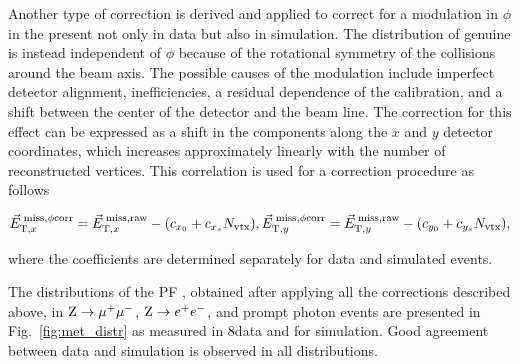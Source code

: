 %
%
Another type of correction is derived and applied to correct for a modulation in $\phi$ in the \ptvecmiss present not only in data but also in simulation. The distribution of genuine \ptvecmiss is instead independent of $\phi$ because of the rotational symmetry of the collisions around the beam axis. The possible causes of the modulation include imperfect detector alignment, inefficiencies, a residual \pt dependence of the calibration, and a shift between the center of the detector and the beam line. The correction for this effect can be expressed as a shift in the \ptvecmiss components along the $x$ and $y$ detector coordinates, which increases approximately linearly with the number of reconstructed vertices. This correlation is used for a correction procedure as follows

\begin{equation}
{\vec E}_{\mathrm{T},x}^\mathrm{\; miss,\phi corr} = {\vec E}_{\mathrm{T},x}^\mathrm{\; miss,raw} - (c_{x_0} + c_{x_s}N_\mathrm{vtx}),\\
{\vec E}_{\mathrm{T},y}^\mathrm{\; miss,\phi corr} = {\vec E}_{\mathrm{T},y}^\mathrm{\; miss,raw} - (c_{y_0} + c_{y_s}N_\mathrm{vtx}),
\end{equation}

where the coefficients are determined separately for data and simulated events.

The distributions of the PF \ETmiss, obtained after applying all the corrections described above, in $\mathrm{Z}\to\mu^+\mu^-$, $\mathrm{Z}\to e^+e^-$, and prompt photon events are presented in Fig.~\ref{fig:met_distr} as measured in 8\TeV data and for simulation. Good agreement between data and simulation is observed in all distributions.

